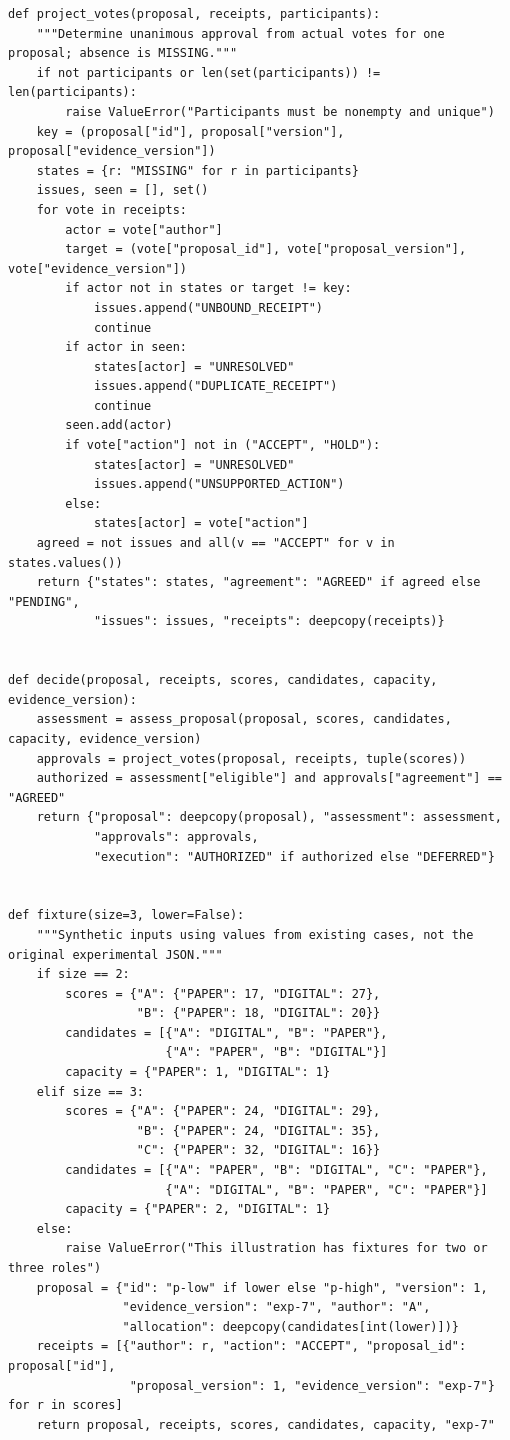 \documentclass[10pt,a4paper]{article}
\begin{document}
\begin{verbatim}
def project_votes(proposal, receipts, participants):
    """Determine unanimous approval from actual votes for one proposal; absence is MISSING."""
    if not participants or len(set(participants)) != len(participants):
        raise ValueError("Participants must be nonempty and unique")
    key = (proposal["id"], proposal["version"], proposal["evidence_version"])
    states = {r: "MISSING" for r in participants}
    issues, seen = [], set()
    for vote in receipts:
        actor = vote["author"]
        target = (vote["proposal_id"], vote["proposal_version"], vote["evidence_version"])
        if actor not in states or target != key:
            issues.append("UNBOUND_RECEIPT")
            continue
        if actor in seen:
            states[actor] = "UNRESOLVED"
            issues.append("DUPLICATE_RECEIPT")
            continue
        seen.add(actor)
        if vote["action"] not in ("ACCEPT", "HOLD"):
            states[actor] = "UNRESOLVED"
            issues.append("UNSUPPORTED_ACTION")
        else:
            states[actor] = vote["action"]
    agreed = not issues and all(v == "ACCEPT" for v in states.values())
    return {"states": states, "agreement": "AGREED" if agreed else "PENDING",
            "issues": issues, "receipts": deepcopy(receipts)}


def decide(proposal, receipts, scores, candidates, capacity, evidence_version):
    assessment = assess_proposal(proposal, scores, candidates, capacity, evidence_version)
    approvals = project_votes(proposal, receipts, tuple(scores))
    authorized = assessment["eligible"] and approvals["agreement"] == "AGREED"
    return {"proposal": deepcopy(proposal), "assessment": assessment,
            "approvals": approvals,
            "execution": "AUTHORIZED" if authorized else "DEFERRED"}


def fixture(size=3, lower=False):
    """Synthetic inputs using values from existing cases, not the original experimental JSON."""
    if size == 2:
        scores = {"A": {"PAPER": 17, "DIGITAL": 27},
                  "B": {"PAPER": 18, "DIGITAL": 20}}
        candidates = [{"A": "DIGITAL", "B": "PAPER"},
                      {"A": "PAPER", "B": "DIGITAL"}]
        capacity = {"PAPER": 1, "DIGITAL": 1}
    elif size == 3:
        scores = {"A": {"PAPER": 24, "DIGITAL": 29},
                  "B": {"PAPER": 24, "DIGITAL": 35},
                  "C": {"PAPER": 32, "DIGITAL": 16}}
        candidates = [{"A": "PAPER", "B": "DIGITAL", "C": "PAPER"},
                      {"A": "DIGITAL", "B": "PAPER", "C": "PAPER"}]
        capacity = {"PAPER": 2, "DIGITAL": 1}
    else:
        raise ValueError("This illustration has fixtures for two or three roles")
    proposal = {"id": "p-low" if lower else "p-high", "version": 1,
                "evidence_version": "exp-7", "author": "A",
                "allocation": deepcopy(candidates[int(lower)])}
    receipts = [{"author": r, "action": "ACCEPT", "proposal_id": proposal["id"],
                 "proposal_version": 1, "evidence_version": "exp-7"} for r in scores]
    return proposal, receipts, scores, candidates, capacity, "exp-7"



\end{verbatim}
\end{document}
